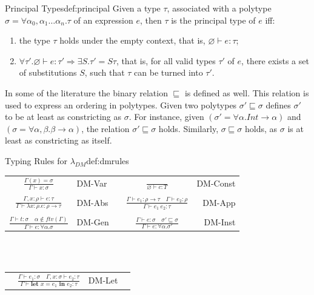 \begin{definitiontitled}{Principal Types}{def:principal}
Given a type $\tau$, associated with a polytype $\sigma = \forall \alpha_0, \alpha_1 \ldots \alpha_n. \tau$ of an expression $e$, then $\tau$ is the principal type of $e$ iff:
\begin{enumerate}
 \item the type $\tau$ holds under the empty context, that is, $\varnothing \vdash e : \tau$;
 \item $\forall \tau'. \varnothing \vdash e : \tau' \Rightarrow \exists S.\tau' = S\tau$, that is, for all valid types $\tau'$ of $e$, there exists a set of substitutions $S$, such that $\tau$ can be turned into $\tau'$.
\end{enumerate}
\end{definitiontitled}

In some of the literature the binary relation $\sqsubseteq$ is defined as well.
This relation is used to express an ordering in polytypes.
Given two polytypes $\sigma' \sqsubseteq \sigma$ defines $\sigma'$ to be at least as constricting as $\sigma$.
For instance, given $(\sigma' = \forall \alpha. \textit{Int} \to \alpha)$ and $(\sigma = \forall \alpha,\beta. \beta \to \alpha)$, the relation $\sigma' \sqsubseteq \sigma$ holds.
Similarly, $\sigma \sqsubseteq \sigma$ holds, as $\sigma$ is at least as constricting as itself.

\begin{definitiontitled}{Typing Rules for $\lambda_{DM}$}{def:dmrules}
\begin{tabularx}{\textwidth}{ c l X c r}
$ \displaystyle
  \frac
    { \Gamma(x) = \sigma }
    { \Gamma \vdash x : \sigma }
$ & 
DM-Var
&
&
$ \displaystyle
  \frac
    { }
    { \varnothing \vdash c : T }
$
&
DM-Const
\\
\\
$ \displaystyle
  \frac
    { \Gamma,x:\rho \vdash e : \tau }
    { \Gamma \vdash \lambda x:\rho.e : \rho \rightarrow \tau}
$
&
DM-Abs
&
&
$ \displaystyle
  \frac
    { \Gamma \vdash e_1 : \rho \rightarrow \tau \quad \Gamma \vdash e_2 : \rho }
    { \Gamma \vdash e_1 \: e_2 : \tau }
$
& 
DM-App
\\
\\
$ \displaystyle
  \frac
  { \Gamma \vdash t : \sigma \quad \alpha \notin \textit{ftv}(\Gamma) }
  { \Gamma \vdash e : \forall \alpha.\sigma }
$
&
DM-Gen
& 
& 
$ \displaystyle
  \frac
  { \Gamma \vdash e : \sigma \quad \sigma' \sqsubseteq \sigma }
  { \Gamma \vdash e : \forall \alpha.\sigma' }
$
&
DM-Inst
\\
\end{tabularx}\\
\\

\begin{tabularx}{\textwidth}{X r l X}
 &
$ \displaystyle
  \frac
    { \Gamma \vdash e_1 : \sigma \quad \Gamma,x:\sigma \vdash e_2 : \tau}
    { \Gamma \vdash \textbf{let } x=e_1 \textbf{ in } e_2 : \tau}
$ 
& 
DM-Let
&
\\
\end{tabularx}
\end{definitiontitled}

